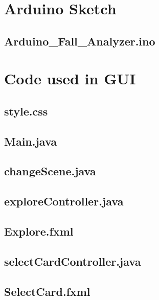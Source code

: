 \section*{\thesection\quad  Arduino Sketch}

\subsection*{Arduino\_Fall\_Analyzer.ino}


\newpage
{}\section*{\thesection\quad  Code used in GUI}

\subsection*{style.css}


\subsection*{Main.java}


\subsection*{changeScene.java}


\subsection*{exploreController.java}


\subsection*{Explore.fxml}


\subsection*{selectCardController.java}


\subsection*{SelectCard.fxml}


